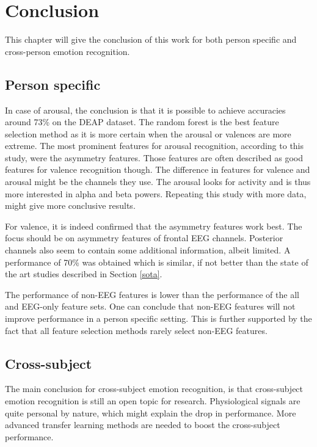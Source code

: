 \chapter{Conclusion}
{\samenvatting This chapter will give the conclusion of this work for both person specific and cross-person emotion recognition.}

\section{Person specific}
In case of arousal, the conclusion is that it is possible to achieve accuracies around 73\% on the DEAP dataset. The random forest is the best feature selection method as it is more certain when the arousal or valences are more extreme. The most prominent features for arousal recognition, according to this study, were the asymmetry features. Those features are often described as good features for valence recognition though. The difference in features for valence and arousal might be the channels they use. The arousal looks for activity and is thus more interested in alpha and beta powers. Repeating this study with more data, might give more conclusive results.

\npar

For valence, it is indeed confirmed that the asymmetry features work best. The focus should be on asymmetry features of frontal EEG channels. Posterior channels also seem to contain some additional information, albeit limited. A performance of 70\% was obtained which is similar, if not better than the state of the art studies described in Section \ref{sota}. 

\npar

The performance of non-EEG features is lower than the performance of the all and EEG-only feature sets. One can conclude that non-EEG features will not improve performance in a person specific setting. This is further supported by the fact that all feature selection methods rarely select non-EEG features. 

\clearpage

\section{Cross-subject}

The main conclusion for cross-subject emotion recognition, is that cross-subject emotion recognition is still an open topic for research. Physiological signals are quite personal by nature, which might explain the drop in performance. More advanced transfer learning methods are needed to boost the cross-subject performance.


